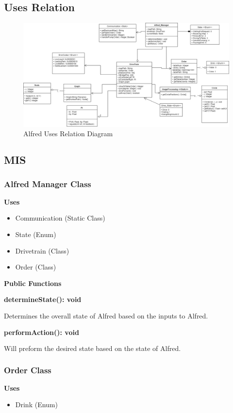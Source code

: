 \documentclass [10pt]{article}
\begin{document}
\subsection{Uses Relation}
\begin{figure} [h!]
	\centering
	\includegraphics [scale = 0.4] {figures/Alfred_UsesDiagram.png}
	\caption{Alfred Uses Relation Diagram}
\end{figure}


\subsection{MIS}

\subsubsection{Alfred Manager Class}

\textbf{Uses}
\begin{itemize}
	\item Communication (Static Class)
	\item State (Enum)
	\item Drivetrain (Class)
	\item Order (Class)
\end{itemize}



\textbf{Public Functions}

\textbf{determineState(): void}

Determines the overall state of Alfred based on the inputs to Alfred. 

\textbf{performAction(): void}

Will preform the desired state based on the state of Alfred.

\subsubsection{Order Class}
\textbf{Uses}
\begin{itemize}
	\item Drink (Enum)
\end{itemize}
\end{document}
